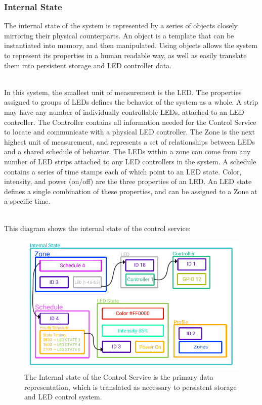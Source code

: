 			\subsubsection{Internal State}
			The internal state of the system is represented by a series of objects closely mirroring their physical counterparts.
			An object is a template that can be instantiated into memory, and then manipulated.
			Using objects allows the system to represent its properties in a human readable way, as well as easily translate them into persistent storage and LED controller data.

			\noindent \\In this system, the smallest unit of measurement is the LED. The properties assigned to groups of LEDs defines the behavior of the system as a whole.
			A strip may have any number of individually controllable LEDs, attached to an LED controller.
			The Controller contains all information needed for the Control Service to locate and communicate with a physical LED controller.
			The Zone is the next highest unit of measurement, and represents a set of relationships between LEDs and a shared schedule of behavior.
			The LEDs within a zone can come from any number of LED strips attached to any LED controllers in the system.
			A schedule contains a series of time stamps each of which point to an LED state.
			Color, intensity, and power (on/off) are the three properties of an LED. An LED state defines a single combination of these properties, and can be assigned to a Zone at a specific time.


			\noindent \\This diagram shows the internal state of the control service:

			\begin{center}
				\begin{figure}[H]
					\includegraphics[width=\linewidth]{systemDiagrams/internalstate.png}
					\caption{The Internal state of the Control Service is the primary data representation, which is translated as necessary to persistent storage and LED control system.}
					\label{fig:internalStateDiagram}
				\end{figure}
			\end{center}

